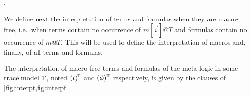 \newcommand{\interp}[1]{(#1)}

.

We define next the interpretation of terms and formulas when they are
macro-free, i.e.\ when terms contain no occurrence of $m[\vec{i}]@T$
and formulas contain no occurrence of $m@T$. This will be used to
define the interpretation of macros and, finally, of all terms
and formulas.

\begin{definition}
  The interpretation of macro-free terms and formulas of the meta-logic in
  some trace model $\mathbb{T}$, noted $\interp{t}^\TM$ and $\interp{\phi}^\TM$
  respectively, is given by the clauses of \cref{fig:interpt,fig:interpf}.
\end{definition}

